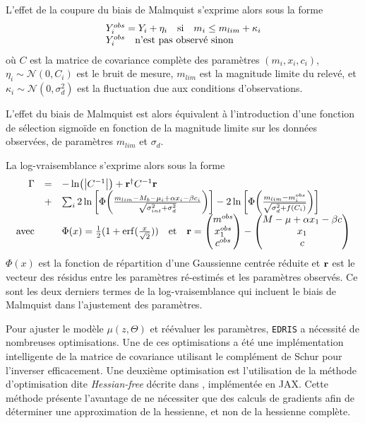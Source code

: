 \documentclass{book}
\def\edris{\texttt{EDRIS}\xspace}
\let\mcl\mathcal
\begin{document}
L'effet de la coupure du biais de Malmquist s'exprime alors sous la forme
\begin{equation}
\begin{array}{l}
	Y_i^{obs} = Y_i + \eta_i \qq{si} m_i \leq m_{lim} + \kappa_i \\
	Y_i^{obs} \qq{n'est pas observé sinon}
\end{array}
\end{equation}
où $C$ est la matrice de covariance complète des paramètres $(m_i, x_i, c_i)$, $\eta_i \sim \mcl N(0, C_i)$ est le bruit de mesure, $m_{lim}$ est la magnitude limite du relevé, et $\kappa_i \sim \mcl N(0, \sigma_d^2)$ est la fluctuation due aux conditions d'observations.

L'effet du biais de Malmquist est alors équivalent à l'introduction d'une fonction de sélection sigmoïde en fonction de la magnitude limite sur les données observées, de paramètres $m_{lim}$ et $\sigma_d$.

La log-vraisemblance s'exprime alors sous la forme
\begin{equation}
	\begin{array}{rcl}
		\Gamma & = & -\ln(\abs{C^{-1}}) + \vb r^\dagger C^{-1} \vb  r\\
			& + & \sum_i 2 \ln\qty[\Phi\qty(\frac{m_{lim} - M_b - \mu_i + \alpha x_i - \beta c_i}{\sqrt{\sigma_{int}^2 + \sigma_d^2}})] - 2 \ln\qty[\Phi\qty(\frac{m_{lim} - m_i^{obs}}{\sqrt{\sigma_d^2 + f(C_i)}})]\\
		\text{avec} & & \Phi(x) = \frac{1}{2}(1 + \erf(\frac{x}{\sqrt{2}})) \qq{et} \vb r = \pmqty{m^{obs}\\x_1^{obs} \\ c^{obs}} - \pmqty{M - \mu+ \alpha x_1 - \beta c\\x_1 \\ c}
	\end{array}
\end{equation}
$\Phi(x)$ est la fonction de répartition d'une Gaussienne centrée réduite et $\vb r$ est le vecteur des résidus entre les paramètres ré-estimés et les paramètres observés. Ce sont les deux derniers termes de la log-vraisemblance qui incluent le biais de Malmquist dans l'ajustement des paramètres.

Pour ajuster le modèle $\mu(z, \Theta)$ et réévaluer les paramètres, \edris a nécessité de nombreuses optimisations. Une de ces optimisations a été une implémentation intelligente de la matrice de covariance utilisant le complément de Schur pour l'inverser efficacement. Une deuxième optimisation est l'utilisation de la méthode d'optimisation dite \textit{Hessian-free} décrite dans \cite{martens_deep_2010}, implémentée en \textsc{JAX}. Cette méthode présente l'avantage de ne nécessiter que des calculs de gradients afin de déterminer une approximation de la hessienne, et non de la hessienne complète.
\end{document}
